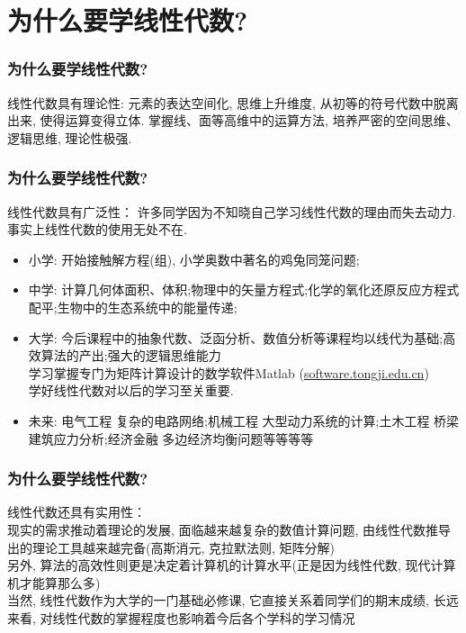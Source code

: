 \documentclass{beamer}
\begin{document}
	\section{为什么要学线性代数?}
	\begin{frame}
	\frametitle{为什么要学线性代数?}
		线性代数具有理论性: 元素的表达空间化, 思维上升维度, 从初等的符号代数中脱离出来, 使得运算变得立体. 掌握线、面等高维中的运算方法, 培养严密的空间思维、逻辑思维, 理论性极强.
	\end{frame}

	\begin{frame}
	\frametitle{为什么要学线性代数?}
		线性代数具有广泛性：
		许多同学因为不知晓自己学习线性代数的理由而失去动力. 事实上线性代数的使用无处不在.\pause
		\begin{itemize}
			\item 小学: 开始接触解方程(组), 小学奥数中著名的鸡兔同笼问题;\pause
			\item 中学: 计算几何体面积、体积;\pause 物理中的矢量方程式;\pause 化学的氧化还原反应方程式配平;\pause 生物中的生态系统中的能量传递; \pause
			\item 大学:  今后课程中的抽象代数、泛函分析、数值分析等课程均以线代为基础;\pause 高效算法的产出;\pause 强大的逻辑思维能力\pause \\学习掌握专门为矩阵计算设计的数学软件Matlab \quad (\url{software.tongji.edu.cn})\pause \\学好线性代数对以后的学习至关重要.\pause
			\item 未来: 电气工程 复杂的电路网络;\pause 机械工程 大型动力系统的计算;\pause 土木工程 桥梁建筑应力分析;\pause 经济金融 多边经济均衡问题等等等等\pause 
		\end{itemize}
	\end{frame}
	
	\begin{frame}
	\frametitle{为什么要学线性代数?}
	线性代数还具有实用性：\\\pause
	现实的需求推动着理论的发展, 面临越来越复杂的数值计算问题, 由线性代数推导出的理论工具越来越完备(高斯消元, 克拉默法则, 矩阵分解) \\\pause
	另外, 算法的高效性则更是决定着计算机的计算水平(正是因为线性代数, 现代计算机才能算那么多) \\\pause
	当然, 线性代数作为大学的一门基础必修课, 它直接关系着同学们的期末成绩, 长远来看, 对线性代数的掌握程度也影响着今后各个学科的学习情况
	\end{frame}
	
\end{document}
